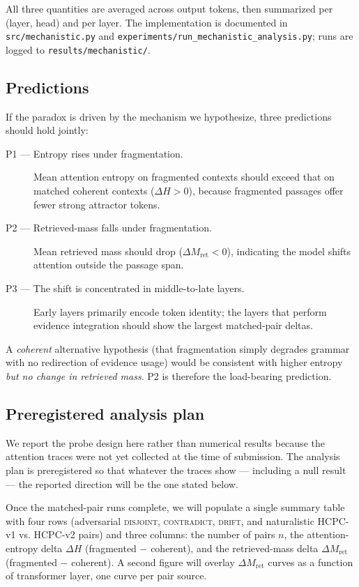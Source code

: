 All three quantities are averaged across output tokens, then summarized
per (layer, head) and per layer. The implementation is documented in
\texttt{src/mechanistic.py} and
\texttt{experiments/run\_mechanistic\_analysis.py}; runs are logged to
\texttt{results/mechanistic/}.

\subsection{Predictions}

If the paradox is driven by the mechanism we hypothesize, three
predictions should hold jointly:

\begin{description}
  \item[P1 — Entropy rises under fragmentation.] Mean attention entropy
        on fragmented contexts should exceed that on matched coherent
        contexts ($\Delta H > 0$), because fragmented passages offer
        fewer strong attractor tokens.
  \item[P2 — Retrieved-mass falls under fragmentation.] Mean retrieved
        mass should drop ($\Delta M_{\text{ret}} < 0$), indicating the
        model shifts attention outside the passage span.
  \item[P3 — The shift is concentrated in middle-to-late layers.] Early
        layers primarily encode token identity; the layers that perform
        evidence integration should show the largest matched-pair deltas.
\end{description}

A \emph{coherent} alternative hypothesis (that fragmentation simply
degrades grammar with no redirection of evidence usage) would be
consistent with higher entropy \emph{but no change in retrieved mass}. P2
is therefore the load-bearing prediction.

\subsection{Preregistered analysis plan}
\label{sec:mech_plan}

We report the probe design here rather than numerical results because
the attention traces were not yet collected at the time of submission.
The analysis plan is preregistered so that whatever the traces show — including
a null result — the reported direction will be the one stated below.

Once the matched-pair runs complete, we will populate a single summary
table with four rows (adversarial \textsc{disjoint}, \textsc{contradict},
\textsc{drift}, and naturalistic HCPC-v1 vs. HCPC-v2 pairs) and three
columns: the number of pairs $n$, the attention-entropy delta $\Delta H$
(fragmented $-$ coherent), and the retrieved-mass delta
$\Delta M_{\text{ret}}$ (fragmented $-$ coherent). A second figure will
overlay $\Delta M_{\text{ret}}$ curves as a function of transformer
layer, one curve per pair source.

